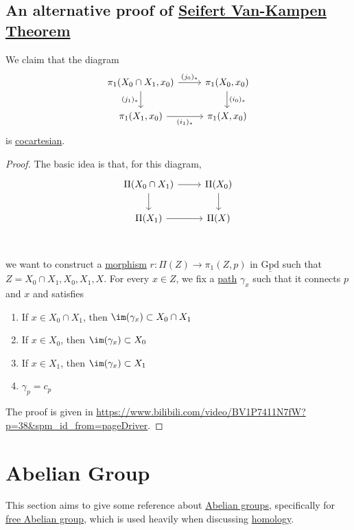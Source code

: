 \subsection{An alternative proof of \hyperref[thm:Seifert-Van-Kampen-Theorem]{Seifert Van-Kampen Theorem}}\label{pf:an-alternative-proof-of-Seifert-Van-Kampen-thm}
\begin{theorem}
	We claim that the diagram
	\[
		\begin{tikzcd}
			{\pi_1(X_0\cap X_1, x_0)} & {\pi_1(X_0, x_0)} \\
			{\pi_1(X_1, x_0)} & {\pi_1(X, x_0)}
			\arrow["{(j_0)_\ast}", from=1-1, to=1-2]
			\arrow["{(i_0)_\ast}", from=1-2, to=2-2]
			\arrow["{(i_1)_\ast}"', from=2-1, to=2-2]
			\arrow["{(j_1)_\ast}"', from=1-1, to=2-1]
		\end{tikzcd}
	\]
	is \hyperref[def:cocartesian]{cocartesian}.
\end{theorem}
\begin{proof}
	The basic idea is that, for this diagram,
	\[\begin{tikzcd}
			{\Pi(X_0\cap X_1)} & {\Pi(X_0)} \\
			{\Pi(X_1)} & {\Pi(X)} \\
			\arrow[from=1-1, to=1-2]
			\arrow[from=1-2, to=2-2]
			\arrow[from=2-1, to=2-2]
			\arrow[from=1-1, to=2-1]
		\end{tikzcd}\]
	we want to construct a \hyperref[def:morphism]{morphism} \(r\colon \Pi (Z)\to \pi _1(Z, p)\) in \(\underline{\mathrm{Gpd}}\) such that
	\(Z = X_0 \cap X_1, X_0, X_1, X\). For every \(x\in Z\), we fix a \hyperref[def:path]{path} \(\gamma _{x} \) such that it connects \(p\) and \(x\) and satisfies
	\begin{enumerate}
		\item If \(x\in X_0 \cap X_1\), then \(\im  (\gamma _{x} )\subset X_0 \cap X_1\)
		\item If \(x\in X_0\), then \(\im  (\gamma _{x} )\subset X_0\)
		\item If \(x\in X_1\), then \(\im  (\gamma _{x} )\subset X_1\)
		\item \(\gamma _p = c_p\)
	\end{enumerate}

	The proof is given in \url{https://www.bilibili.com/video/BV1P7411N7fW?p=38&spm_id_from=pageDriver}.
\end{proof}

\section{Abelian Group}
This section aims to give some reference about \hyperref[def:Abelian-group]{Abelian groups}, specifically for \hyperref[def:free-Abelian-group]{free Abelian group}, which is used
heavily when discussing \hyperref[def:homology]{homology}.
